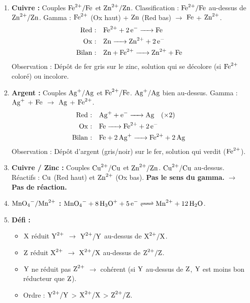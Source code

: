 \documentclass[11pt]{article}
\begin{document}
\begin{corrige}[Exercice 1]
\begin{enumerate}
  \item \textbf{Cuivre :} Couples $\ce{Fe^2+}/\ce{Fe}$ et $\ce{Zn^2+}/\ce{Zn}$. Classification : $\ce{Fe^2+}/\ce{Fe}$ au-dessus de $\ce{Zn^2+}/\ce{Zn}$. Gamma : $\ce{Fe^2+}$ (Ox haut) + $\ce{Zn}$ (Red bas) $\to$ $\ce{Fe}$ + $\ce{Zn^2+}$.
  \begin{align*}
    \text{Red :} &\quad \ce{Fe^2+ + 2e- -> Fe} \\
    \text{Ox :} &\quad \ce{Zn -> Zn^2+ + 2e-} \\
    \text{Bilan :} &\quad \ce{Zn + Fe^2+ -> Zn^2+ + Fe}
  \end{align*}
  Observation : Dépôt de fer gris sur le zinc, solution qui se décolore (si $\ce{Fe^2+}$ coloré) ou incolore.
  \item \textbf{Argent :} Couples $\ce{Ag+}/\ce{Ag}$ et $\ce{Fe^2+}/\ce{Fe}$. $\ce{Ag+}/\ce{Ag}$ bien au-dessus. Gamma : $\ce{Ag+}$ + $\ce{Fe}$ $\to$ $\ce{Ag}$ + $\ce{Fe^2+}$.
  \begin{align*}
    \text{Red :} &\quad \ce{Ag+ + e- -> Ag} \quad (\times 2) \\
    \text{Ox :} &\quad \ce{Fe -> Fe^2+ + 2e-} \\
    \text{Bilan :} &\quad \ce{Fe + 2Ag+ -> Fe^2+ + 2Ag}
  \end{align*}
  Observation : Dépôt d'argent (gris/noir) sur le fer, solution qui verdit ($\ce{Fe^2+}$).
  \item \textbf{Cuivre / Zinc :} Couples $\ce{Cu^2+}/\ce{Cu}$ et $\ce{Zn^2+}/\ce{Zn}$. $\ce{Cu^2+}/\ce{Cu}$ au-dessus. Réactifs : $\ce{Cu}$ (Red haut) et $\ce{Zn^2+}$ (Ox bas). \textbf{Pas le sens du gamma.} $\to$ \textbf{Pas de réaction.}
  \item \textbf{$\ce{MnO4-}/\ce{Mn^2+}$ :} $\ce{MnO4- + 8H3O+ + 5e- <=> Mn^2+ + 12H2O}$.
  \item \textbf{Défi :}
  \begin{itemize}
    \item $\ce{X}$ réduit $\ce{Y^2+}$ $\to$ $\ce{Y^2+}/\ce{Y}$ au-dessus de $\ce{X^2+}/\ce{X}$.
    \item $\ce{Z}$ réduit $\ce{X^2+}$ $\to$ $\ce{X^2+}/\ce{X}$ au-dessus de $\ce{Z^2+}/\ce{Z}$.
    \item $\ce{Y}$ ne réduit pas $\ce{Z^2+}$ $\to$ cohérent (si $\ce{Y}$ au-dessus de $\ce{Z}$, $\ce{Y}$ est moins bon réducteur que $\ce{Z}$).
    \item Ordre : $\ce{Y^2+}/\ce{Y}$ > $\ce{X^2+}/\ce{X}$ > $\ce{Z^2+}/\ce{Z}$.

\end{itemize}
\end{enumerate}
\end{corrige}
\end{document}
